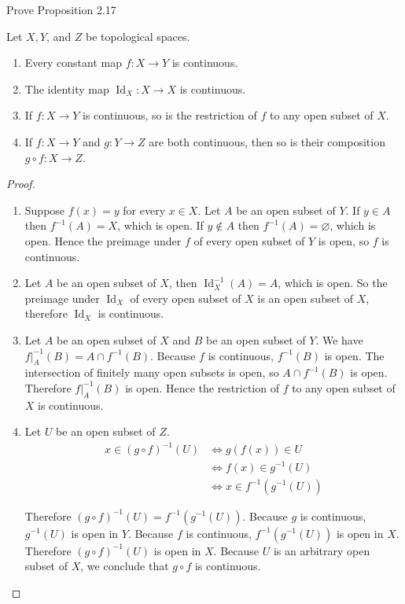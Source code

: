\begin{exercise}{2.18}\label{exercise:2.18}
	Prove Proposition 2.17

	Let $X, Y$, and $Z$ be topological spaces.

	\begin{enumerate}[label={(\alph*)}]
		\item Every constant map $f: X\to Y$ is continuous.
		\item The identity map $\operatorname{Id}_{X}: X\to X$ is continuous.
		\item If $f: X\to Y$ is continuous, so is the restriction of $f$ to any open subset of $X$.
		\item If $f: X\to Y$ and $g: Y\to Z$ are both continuous, then so is their composition $g\circ f: X\to Z$.
	\end{enumerate}
\end{exercise}

\begin{proof}
	\begin{enumerate}[label={(\alph*)}]
		\item Suppose $f(x) = y$ for every $x\in X$. Let $A$ be an open subset of $Y$. If $y\in A$ then $f^{-1}(A) = X$, which is open. If $y\notin A$ then $f^{-1}(A) = \varnothing$, which is open. Hence the preimage under $f$ of every open subset of $Y$ is open, so $f$ is continuous.
		\item Let $A$ be an open subset of $X$, then $\operatorname{Id}_{X}^{-1}(A) = A$, which is open. So the preimage under $\operatorname{Id}_{X}$ of every open subset of $X$ is an open subset of $X$, therefore $\operatorname{Id}_{X}$ is continuous.
		\item Let $A$ be an open subset of $X$ and $B$ be an open subset of $Y$. We have $f\vert_{A}^{-1}(B) = A\cap f^{-1}(B)$. Because $f$ is continuous, $f^{-1}(B)$ is open. The intersection of finitely many open subsets is open, so $A\cap f^{-1}(B)$ is open. Therefore $f\vert_{A}^{-1}(B)$ is open. Hence the restriction of $f$ to any open subset of $X$ is continuous.
		\item Let $U$ be an open subset of $Z$.
		      \begin{align*}
			      x\in {(g\circ f)}^{-1}(U) & \Longleftrightarrow g(f(x))\in U           \\
			                                & \Longleftrightarrow f(x)\in g^{-1}(U)      \\
			                                & \Longleftrightarrow x\in f^{-1}(g^{-1}(U))
		      \end{align*}

		      Therefore ${(g\circ f)}^{-1}(U) = f^{-1}(g^{-1}(U))$. Because $g$ is continuous, $g^{-1}(U)$ is open in $Y$. Because $f$ is continuous, $f^{-1}(g^{-1}(U))$ is open in $X$. Therefore ${(g\circ f)}^{-1}(U)$ is open in $X$. Because $U$ is an arbitrary open subset of $X$, we conclude that $g\circ f$ is continuous.
	\end{enumerate}
\end{proof}

